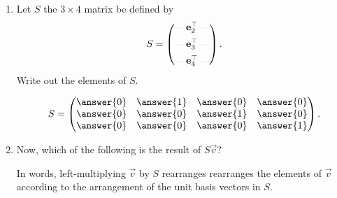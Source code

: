 \documentclass{ximera}
\newcommand{\rvx}[1]{\rule[0.5ex]{1em}{.05pt}\,#1\,\rule[0.5ex]{1em}{.05pt}}
\begin{document}
\begin{exercise}
\begin{enumerate}
  \item Let $S$ the $3 \times 4$ matrix be defined by
    \[
      S =
      \begin{pmatrix}
        \rvx{\vec{e}_2^\transpose}\\[0.5em]
        \rvx{\vec{e}_3^\transpose}\\[0.5em]
        \rvx{\vec{e}_4^\transpose}
      \end{pmatrix}.
    \]
    Write out the elements of $S$.
    \begin{prompt}
      \[
        S =
        \begin{pmatrix}
          \answer{0} & \answer{1} & \answer{0} & \answer{0} \\
          \answer{0} & \answer{0} & \answer{1} & \answer{0} \\
          \answer{0} & \answer{0} & \answer{0} & \answer{1}
        \end{pmatrix}.
      \]
    \end{prompt}

  \item  Now, which of the following is the result of $S \vec{v}$?
    \begin{multipleChoice}
    \end{multipleChoice}

    \begin{feedback}[correct]
      In words, left-multiplying $\vec{v}$ by $S$ rearranges
      rearranges the elements of $\vec{v}$ according to the
      arrangement of the unit basis vectors in $S$.
    \end{feedback}
  \end{enumerate}
\end{exercise}
\end{document}
